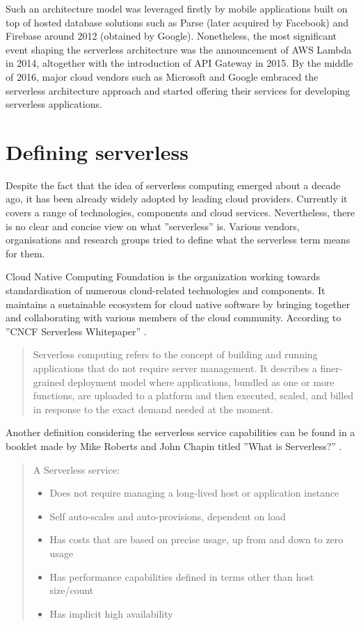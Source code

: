 Such an architecture model was leveraged firstly by mobile applications built on top of hosted database solutions such as Parse (later acquired by Facebook) and Firebase around 2012 (obtained by Google). Nonetheless, the most significant event shaping the serverless architecture was the announcement of AWS Lambda in 2014, altogether with the introduction of API Gateway in 2015. By the middle of 2016, major cloud vendors such as Microsoft and Google embraced the serverless architecture approach and started offering their services for developing serverless applications.

\section{Defining serverless} \label{section:serverless-definition}

Despite the fact that the idea of serverless computing emerged about a decade ago, it has been already widely adopted by leading cloud providers. Currently it covers a range of technologies, components and cloud services. Nevertheless, there is no clear and concise view on what ''serverless'' is. Various vendors, organisations and research groups tried to define what the serverless term means for them.

Cloud Native Computing Foundation is the organization working towards standardisation of numerous cloud-related technologies and components. It maintains a sustainable ecosystem for cloud native software by bringing together and collaborating with various members of the cloud community. According to ''CNCF Serverless Whitepaper'' \cite{CNCFServerless}.

\begin{quotation}
Serverless computing refers to the concept of building and running applications that do not require server management. It describes a finer-grained deployment model where applications, bundled as one or more functions, are uploaded to a platform and then executed, scaled, and billed in response to the exact demand needed at the moment.
\end{quotation}

Another definition considering the serverless service capabilities can be found in a booklet made by Mike Roberts and John Chapin titled ''What is Serverless?'' \cite{RobertsChapin2017}.

\begin{quotation}
\noindent A Serverless service:
\begin{itemize}
    \item Does not require managing a long-lived host or application instance
    \item Self auto-scales and auto-provisions, dependent on load
    \item Has costs that are based on precise usage, up from and down to zero usage
    \item Has performance capabilities defined in terms other than host size/count
    \item Has implicit high availability
\end{itemize}
\end{quotation}

